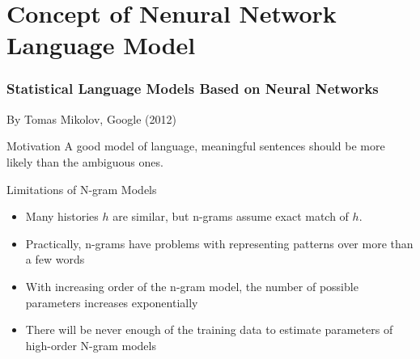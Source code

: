 \documentclass{beamer}
\begin{document}
\section{Concept of Nenural Network Language Model}
\begin{frame}[label=go_nnlm]\frametitle{Statistical Language Models Based on \textbf{N}eural
    \textbf{N}etworks}
By Tomas Mikolov, Google (2012)
\begin{block}{Motivation}
A good model of language, meaningful sentences should be more likely
than the ambiguous ones.
\end{block}

\begin{block}{Limitations of N-gram Models}
\begin{itemize}
\item Many histories $h$ are similar, but n-grams assume exact
match of $h$.
\item Practically, n-grams have problems with representing
patterns over more than a few words
\item With increasing order of the n-gram model, the number of
possible parameters increases \alert{exponentially}
\item There will be never enough of the training data to estimate
parameters of high-order N-gram models
\end{itemize}
\end{block}
\hyperlink{go_architecture}{}
\end{frame}
\end{document}
